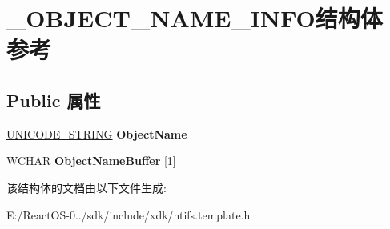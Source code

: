\hypertarget{struct___o_b_j_e_c_t___n_a_m_e___i_n_f_o}{}\section{\+\_\+\+O\+B\+J\+E\+C\+T\+\_\+\+N\+A\+M\+E\+\_\+\+I\+N\+F\+O结构体 参考}
\label{struct___o_b_j_e_c_t___n_a_m_e___i_n_f_o}
\subsection*{Public 属性}
\begin{DoxyCompactItemize}
\item 
\mbox{\label{struct___o_b_j_e_c_t___n_a_m_e___i_n_f_o_a08a2c52e24a8b68f3953b15ae82cf1e9}} 
\hyperlink{struct___u_n_i_c_o_d_e___s_t_r_i_n_g}{U\+N\+I\+C\+O\+D\+E\+\_\+\+S\+T\+R\+I\+NG} {\bfseries Object\+Name}
\item 
\mbox{\label{struct___o_b_j_e_c_t___n_a_m_e___i_n_f_o_a9aba746868d9eb66c0b74810a533a923}} 
W\+C\+H\+AR {\bfseries Object\+Name\+Buffer} \mbox{[}1\mbox{]}
\end{DoxyCompactItemize}


该结构体的文档由以下文件生成\+:\begin{DoxyCompactItemize}
\item 
E\+:/\+React\+O\+S-\/0../sdk/include/xdk/ntifs.\+template.\+h\end{DoxyCompactItemize}
